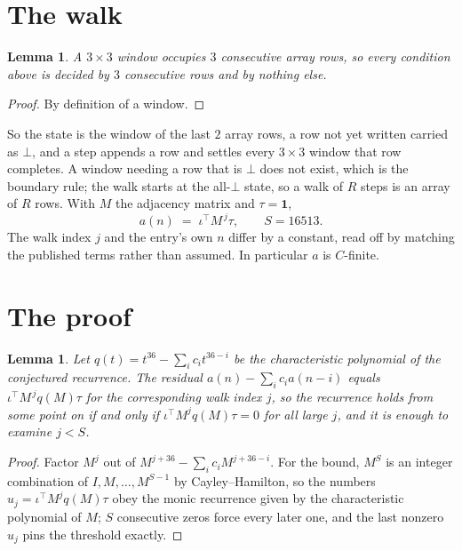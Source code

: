 \documentclass[11pt,a4paper]{article}
\theoremstyle{plain}
\newtheorem{lemma}[theorem]{Lemma}
\theoremstyle{definition}
\begin{document}
\section{The walk}

\begin{lemma}\label{lem:win}
A $3\times3$ window occupies $3$ consecutive array rows, so every condition above is
decided by $3$ consecutive rows and by nothing else.
\end{lemma}

\begin{proof}
By definition of a window.
\end{proof}

So the state is the window of the last $2$ array rows, a row not yet written carried as
$\bot$, and a step appends a row and settles every $3\times3$ window that row completes. A
window needing a row that is $\bot$ does not exist, which is the boundary rule; the walk starts
at the all-$\bot$ state, so a walk of $R$ steps is an array of $R$ rows. With $M$ the adjacency
matrix and $\tau=\mathbf{1}$,
\[
a(n)\;=\;\iota^{\!\top}M^{\,j}\tau ,\qquad S=16513.
\]
The walk index $j$ and the entry's own $n$ differ by a constant, read off by matching the
published terms rather than assumed. In particular $a$ is $C$-finite.

\section{The proof}

\begin{lemma}\label{lem:crit}
Let $q(t)=t^{36}-\sum_i c_it^{36-i}$ be the characteristic polynomial of the
conjectured recurrence. The residual $a(n)-\sum_ic_ia(n-i)$ equals
$\iota^{\!\top}M^{\,j}q(M)\tau$ for the corresponding walk index $j$, so the recurrence
holds from some point on if and only if $\iota^{\!\top}M^{j}q(M)\tau=0$ for all large $j$,
and it is enough to examine $j<S$.
\end{lemma}

\begin{proof}
Factor $M^{j}$ out of $M^{j+36}-\sum_ic_iM^{j+36-i}$. For the bound, $M^{S}$
is an integer combination of $I,M,\dots,M^{S-1}$ by Cayley--Hamilton, so the numbers
$u_j=\iota^{\!\top}M^{j}q(M)\tau$ obey the monic recurrence given by the characteristic
polynomial of $M$; $S$ consecutive zeros force every later one, and the last nonzero $u_j$
pins the threshold exactly.
\end{proof}
\end{document}
